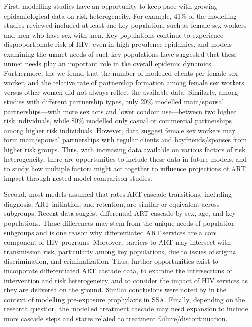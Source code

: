 First, modelling studies have an opportunity to keep pace with growing epidemiological data on risk heterogeneity.
For example, 41\% of the modelling studies reviewed included at least one key population,
such as female sex workers and men who have sex with men.
Key populations continue to experience disproportionate risk of HIV, even in high-prevalence epidemics,
and models examining the unmet needs of such key populations have suggested that
these unmet needs play an important role in the overall epidemic dynamics.
Furthermore, the we found that the number of modelled clients per female sex worker, and
the relative rate of partnership formation among female sex workers versus other women
did not always reflect the available data.
Similarly, among studies with different partnership types, only 20\% modelled
main/spousal partnerships---with more sex acts and lower condom use---between two higher risk individuals,
while 80\% modelled only casual or commercial partnerships among higher risk individuals.
However, data suggest female sex workers may form main/spousal partnerships
with regular clients and boyfriends/spouses from higher risk groups.
Thus, with increasing data available on various factors of risk heterogeneity,
there are opportunities to include these data in future models,
and to study how multiple factors might act together to influence projections of ART impact
through nested model comparison studies.

Second, most models assumed that rates ART cascade transitions,
including diagnosis, ART initiation, and retention,
are similar or equivalent across subgroups.
Recent data suggest differential ART cascade by sex, age, and key populations.
These differences may stem from the unique needs of population subgroups
and is one reason why differentiated ART services are a core component of HIV programs.
Moreover, barriers to ART may intersect with transmission risk, particularly among key populations,
due to issues of stigma, discrimination, and criminalization.
Thus, further opportunities exist to incorporate differentiated ART cascade data,
to examine the intersections of intervention and risk heterogeneity, and
to consider the impact of HIV services as they are delivered on the ground.
Similar conclusions were noted by \citet{Case2019}
in the context of modelling pre-exposure prophylaxis in SSA.
Finally, depending on the research question, the modelled treatment cascade may need expansion
to include more cascade steps and states related to treatment failure/discontinuation.

